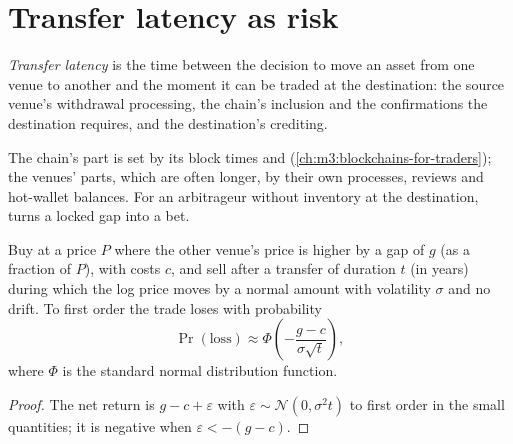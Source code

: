 \section{Transfer latency as risk}

\begin{definition}\label{def:m3:spot-markets:latency}
\emph{Transfer latency} is the time between the decision to move an asset from one
venue to another and the moment it can be traded at the destination: the source venue's withdrawal
processing, the chain's inclusion and the confirmations the destination requires, and the destination's
crediting.
\end{definition}

The chain's part is set by its block times and  (\cref{ch:m3:blockchains-for-traders}); the venues'
parts, which are often longer, by their own processes, reviews and hot-wallet balances. For an arbitrageur
without inventory at the destination,  turns a locked gap into a bet.

\begin{proposition}\label{prop:m3:spot-markets:ploss}
Buy at a price $P$ where the other venue's price is higher by a gap of $g$ (as a fraction of $P$), with
costs $c$, and sell after a transfer of duration $t$ (in years) during which the log price moves by a normal
amount with volatility $\sigma$ and no drift. To first order the trade loses with probability
\[
\Pr(\text{loss}) \approx \Phi\!\left(-\frac{g - c}{\sigma\sqrt{t}}\right),
\]
where $\Phi$ is the standard normal distribution function.
\end{proposition}

\begin{proof}
The net return is $g - c + \varepsilon$ with $\varepsilon \sim \mathcal{N}(0, \sigma^2 t)$ to first order in
the small quantities; it is negative when $\varepsilon < -(g - c)$.
\end{proof}

